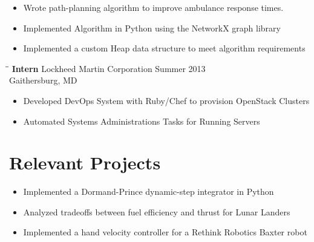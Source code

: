 \documentclass[12pt]{res}
\begin{document}
\begin{resume}
	\vspace{-40pt}
	\begin{itemize}
	\item Wrote path-planning algorithm to improve ambulance response times.
	\vspace{-10pt}
	\item Implemented Algorithm in Python using the NetworkX graph library
	\vspace{-10pt}
	\item Implemented a custom Heap data structure to meet algorithm requirements
	\end{itemize}
    
    \vspace{-10pt}
    \begin{tabbing}
    \hspace{2.3in}\= \hspace{2.6in}\= \kill %
    \textbf{ Intern } \> Lockheed Martin Corporation \> Summer 2013\\
                  \> Gaithersburg, MD
    \end{tabbing}\vspace{-10pt}

	\vspace{-15pt}
	\begin{itemize}
	\item Developed DevOps System with Ruby/Chef to provision 
		OpenStack Clusters
	\vspace{-10pt} 
	\item Automated Systems Administrations Tasks for Running Servers
	\end{itemize}

  \vspace{-20pt}
  \section{Relevant Projects}
	\vspace{-10pt}
	\begin{itemize}
	\item Implemented a Dormand-Prince dynamic-step integrator
		in Python
	\vspace{-10pt}
	\item Analyzed tradeoffs between fuel efficiency and thrust for
		Lunar Landers	
	\vspace{-10pt}
	\item Implemented a hand velocity controller for a Rethink Robotics
		Baxter robot
	\end{itemize}


\end{resume}
\end{document}
